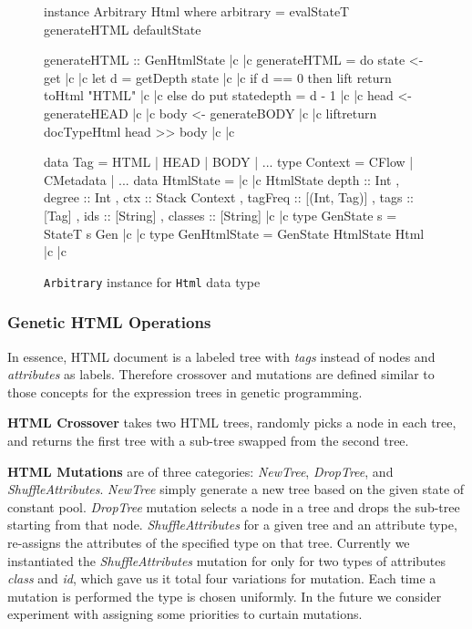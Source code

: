 \documentclass[sigconf]{acmart}
\begin{document}
\begin{figure}[t]
  \begin{haskell}
instance Arbitrary Html where
  arbitrary = evalStateT generateHTML defaultState

generateHTML :: GenHtmlState |c \label{ref.generateHTML.begin} |c
generateHTML = do
  state <- get |c \label{ref.generateHTML.getState} |c   
  let d = getDepth state |c \label{ref.generateHTML.getDepth} |c
  if d == 0
  then lift \dollar return \dollar toHtml "HTML" |c \label{ref.generateHTML.returnString} |c
  else do put state{depth = d - 1} |c \label{ref.generateHTML.updateState} |c
           head <- generateHEAD |c \label{ref.generateHTML.newHead} |c
           body <- generateBODY |c \label{ref.generateHTML.newBody} |c
           lift\dollar return \dollar docTypeHtml \dollar head >> body |c \label{ref.generateHTML.end} |c

data Tag = HTML | HEAD | BODY | ...
type Context = CFlow | CMetadata | ...
data HtmlState = |c \label{ref.HtmlState.begin} |c
  HtmlState { depth      :: Int 
             , degree    :: Int    
             , ctx       :: Stack Context 
             , tagFreq   :: [(Int, Tag)] 
             , tags      :: [Tag]
             , ids       :: [String]
             , classes   :: [String] } |c \label{ref.HtmlState.end} |c
type GenState s = StateT s Gen |c \label{ref.GenState} |c
type GenHtmlState = GenState HtmlState Html |c \label{ref.GenHtmlState} |c
  \end{haskell}
  \caption{\texttt{Arbitrary} instance for \texttt{Html} data type}
  \label{fig.html.arb.def}
\end{figure}

\subsubsection{Genetic HTML Operations}
\label{sub.sub.sec.genetic.oper}

In essence, HTML document is a labeled tree with \emph{tags} instead of nodes and \emph{attributes} as labels. Therefore crossover and mutations are defined similar to those concepts for the expression trees in genetic programming.  

\textbf{HTML Crossover} takes two HTML trees, randomly picks a node in each tree, and returns the first tree with a sub-tree swapped from the second tree.

\textbf{HTML Mutations} are of three categories: \emph{NewTree}, \emph{DropTree}, and \emph{ShuffleAttributes}. \emph{NewTree} simply generate a new tree based on the given state of constant pool. \emph{DropTree} mutation selects a node in a tree and drops the sub-tree starting from that node. \emph{ShuffleAttributes} for a given tree and an attribute type, re-assigns the attributes of the specified type on that tree. Currently we instantiated the \emph{ShuffleAttributes} mutation for only for two types of attributes \emph{class} and \emph{id}, which gave us it total four variations for mutation. Each time a mutation is performed the type is chosen uniformly. In the future we consider experiment with assigning some priorities to curtain mutations.  
\end{document}
